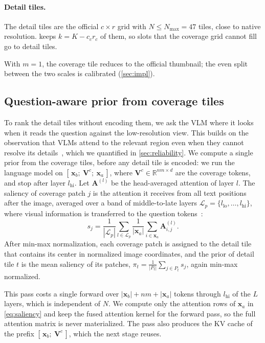 \paragraph{Detail tiles.} The detail tiles are the official $c\times r$ grid with $N\le N_{\max}=47$
tiles, \ie close to native resolution. \method keeps $k=K-c_cr_c$ of them, so slots that the coverage grid
cannot fill go to detail tiles.

With $m=1$, the coverage tile reduces to the official thumbnail; the even split between the two scales
is calibrated (\cref{sec:impl}).

\subsection{Question-aware prior from coverage tiles}
\label{sec:prior}

To rank the detail tiles without encoding them, we ask the VLM where it looks when it reads the question
against the low-resolution view. This builds on the observation that VLMs attend to the relevant region
even when they cannot resolve its details~\cite{vicrop}, which we quantified in \cref{sec:reliability}. We compute a single prior from the coverage
tiles, before any detail tile is encoded: we run the language
model on
$[\,\mathbf{x}_b;\ \mathbf{V}^{c};\ \mathbf{x}_a\,]$, where $\mathbf{V}^{c}\in\mathbb{R}^{nm\times d}$
are the coverage tokens, and stop after layer $l_{\text{hi}}$. Let $\mathbf{A}^{(l)}$ be the
head-averaged attention of layer $l$. The saliency of coverage patch $j$ is the attention it receives
from all text positions after the image, averaged over a band of middle-to-late layers
$\mathcal{L}_p=\{l_{\text{lo}},\dots,l_{\text{hi}}\}$, where visual information is transferred to the
question tokens~\cite{crossmodalflow}:
\begin{equation}
  s_j=\frac{1}{|\mathcal{L}_p|}\sum_{l\in\mathcal{L}_p}\frac{1}{|\mathbf{x}_a|}
      \sum_{i\in\mathbf{x}_a}\mathbf{A}^{(l)}_{i,j}.
  \label{eq:saliency}
\end{equation}
After min-max normalization, each coverage patch is assigned to the detail tile that contains its
center in normalized image coordinates, and the prior of detail tile $t$ is the mean saliency of its
patches, $\pi_t=\frac{1}{|P_t|}\sum_{j\in P_t}s_j$, again min-max normalized.

This pass costs a single forward over $|\mathbf{x}_b|+nm+|\mathbf{x}_a|$ tokens through
$l_{\text{hi}}$ of the $L$ layers, which is independent of $N$. We compute only the attention rows of
$\mathbf{x}_a$ in \cref{eq:saliency} and keep the fused attention kernel for the forward pass, so the
full attention matrix is never materialized. The pass also produces the KV cache of the prefix
$[\,\mathbf{x}_b;\ \mathbf{V}^{c}\,]$, which the next stage reuses.

